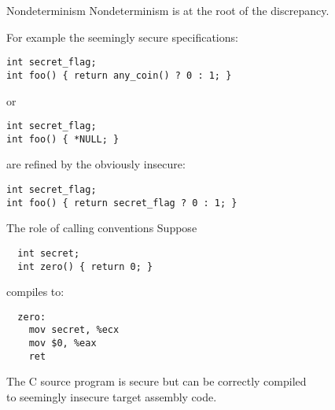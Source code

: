 \documentclass{beamer}
\begin{document}
\begin{frame}[fragile]{Nondeterminism}
Nondeterminism is at the root of the discrepancy.

\vfill
For example the seemingly secure specifications:
\begin{verbatim}
int secret_flag;
int foo() { return any_coin() ? 0 : 1; }
\end{verbatim}
or
\begin{verbatim}
int secret_flag;
int foo() { *NULL; }
\end{verbatim}
are refined by the obviously insecure:
\begin{verbatim}
int secret_flag;
int foo() { return secret_flag ? 0 : 1; }
\end{verbatim}
\end{frame}

\begin{frame}[fragile]{The role of calling conventions}
Suppose
\begin{verbatim}
  int secret;
  int zero() { return 0; }
\end{verbatim}
compiles to:
\begin{verbatim} 
  zero:
    mov secret, %ecx
    mov $0, %eax
    ret
\end{verbatim}
The C source program is secure but can be correctly compiled \\
to seemingly insecure target assembly code.
\end{frame}
\end{document}
